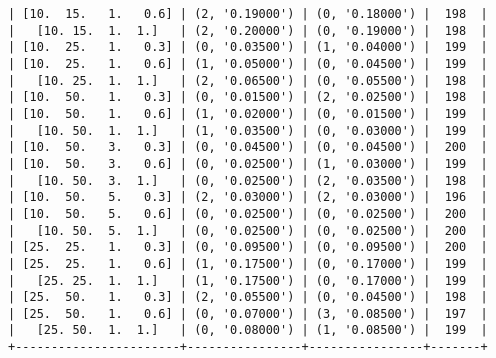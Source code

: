 \documentclass{article}
\begin{document}
\begin{verbatim}
| [10.  15.   1.   0.6] | (2, '0.19000') | (0, '0.18000') |  198  |
|   [10. 15.  1.  1.]   | (2, '0.20000') | (0, '0.19000') |  198  |
| [10.  25.   1.   0.3] | (0, '0.03500') | (1, '0.04000') |  199  |
| [10.  25.   1.   0.6] | (1, '0.05000') | (0, '0.04500') |  199  |
|   [10. 25.  1.  1.]   | (2, '0.06500') | (0, '0.05500') |  198  |
| [10.  50.   1.   0.3] | (0, '0.01500') | (2, '0.02500') |  198  |
| [10.  50.   1.   0.6] | (1, '0.02000') | (0, '0.01500') |  199  |
|   [10. 50.  1.  1.]   | (1, '0.03500') | (0, '0.03000') |  199  |
| [10.  50.   3.   0.3] | (0, '0.04500') | (0, '0.04500') |  200  |
| [10.  50.   3.   0.6] | (0, '0.02500') | (1, '0.03000') |  199  |
|   [10. 50.  3.  1.]   | (0, '0.02500') | (2, '0.03500') |  198  |
| [10.  50.   5.   0.3] | (2, '0.03000') | (2, '0.03000') |  196  |
| [10.  50.   5.   0.6] | (0, '0.02500') | (0, '0.02500') |  200  |
|   [10. 50.  5.  1.]   | (0, '0.02500') | (0, '0.02500') |  200  |
| [25.  25.   1.   0.3] | (0, '0.09500') | (0, '0.09500') |  200  |
| [25.  25.   1.   0.6] | (1, '0.17500') | (0, '0.17000') |  199  |
|   [25. 25.  1.  1.]   | (1, '0.17500') | (0, '0.17000') |  199  |
| [25.  50.   1.   0.3] | (2, '0.05500') | (0, '0.04500') |  198  |
| [25.  50.   1.   0.6] | (0, '0.07000') | (3, '0.08500') |  197  |
|   [25. 50.  1.  1.]   | (0, '0.08000') | (1, '0.08500') |  199  |
+-----------------------+----------------+----------------+-------+
\end{verbatim}
\end{document}
